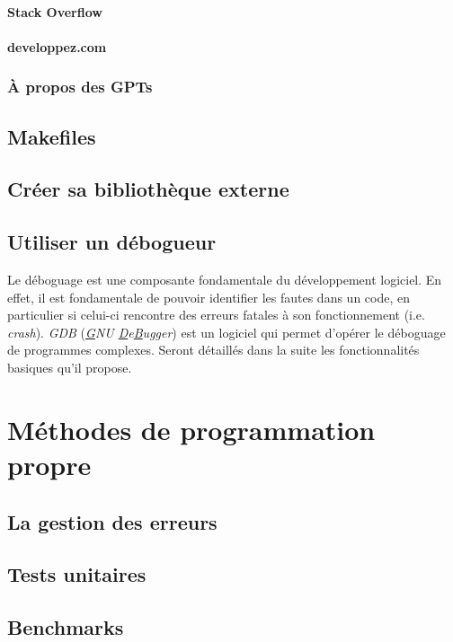 \documentclass{minitelreport}
\begin{document}
\begin{refsection}
				\subsubsection{Stack Overflow}
				\subsubsection{developpez.com}
			\subsection{À propos des GPTs}
			
		\section{Makefiles}
		
		\section{Créer sa bibliothèque externe}
		\section{Utiliser un débogueur}
		Le déboguage est une composante fondamentale du développement logiciel. En effet, il est fondamentale de pouvoir identifier les fautes dans un code, en particulier si celui-ci rencontre des erreurs fatales à son fonctionnement (i.e. \textit{crash}). \textit{GDB} (\textit{\underline{G}NU \underline{D}e\underline{B}ugger}) est un logiciel qui permet d'opérer le déboguage de programmes complexes. Seront détaillés dans la suite les fonctionnalités basiques qu'il propose.
	\chapter{Méthodes de programmation propre}
		\section{La gestion des erreurs}
		
		\section{Tests unitaires}
		
		\section{Benchmarks}
		

\end{refsection}
\end{document}
